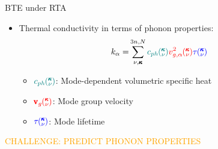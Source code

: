 \documentclass{beamer}
\newcommand{\kv}{\mspace{-4.0mu}\left(\mspace{-8.0mu}
\begin{smallmatrix}&\pmb{\kappa} \\&\nu\end{smallmatrix}
\mspace{-3.0mu}\right)}
\begin{document}
\begin{frame}{BTE under RTA}
\begin{itemize}
\item Thermal conductivity in terms of phonon properties:
\begin{equation}\label{EQ:M:conductivity}
\begin{split}
k_{\mathbf{\alpha}}=&\sum_{\nu,\pmb{\kappa}}^{3n,N} \textcolor{teal}{c_{ph}\kv}
\textcolor{red}{v^{2}_{g,\mathbf{\alpha}}\kv} \textcolor{blue}{\tau\kv}
\end{split}
\end{equation}
\begin{itemize}
\item $\textcolor{teal}{c_{ph}\kv}$: Mode-dependent volumetric specific heat
\item $\textcolor{red}{\pmb{\mathrm{v}}_{g}\kv}$: Mode group velocity
\item $\textcolor{blue}{\tau\kv}$: Mode lifetime
\end{itemize}

\end{itemize}
\textcolor{orange}{CHALLENGE: PREDICT PHONON PROPERTIES}
\end{frame}


\end{document}
